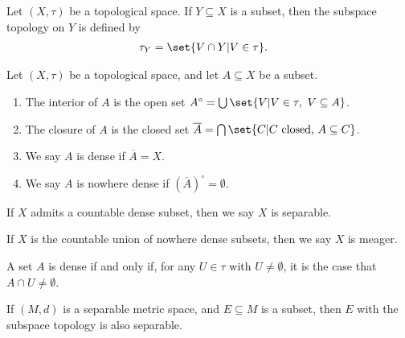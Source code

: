 \begin{definition}
Let $\left(X,\tau\right)$ be a topological space. If $Y\subseteq X$ is a subset, then the subspace topology on $Y$ is defined by
\begin{align*}
  \tau_{Y} &= \set{V\cap Y | V\in \tau}.
\end{align*}

\end{definition}
\begin{definition}\label{def:nowhere_dense}
  Let $\left(X,\tau\right)$ be a topological space, and let $A\subseteq X$ be a subset.
  \begin{enumerate}[(1)]
    \item The interior of $A$ is the open set $A^{\circ} = \bigcup\set{V | V\in\tau,~V\subseteq A}$.
    \item The closure of $A$ is the closed set $\overline{A} = \bigcap\set{C| C\text{ closed, }A\subseteq C}$.
    \item We say $A$ is dense if $\overline{A} = X$.
    \item We say $A$ is nowhere dense if $\left(\overline{A}\right)^{\circ} = \emptyset$.
  \end{enumerate}
  If $X$ admits a countable dense subset, then we say $X$ is separable.\newline

  If $X$ is the countable union of nowhere dense subsets, then we say $X$ is meager.
\end{definition}
\begin{remark}
  A set $A$ is dense if and only if, for any $U\in \tau$ with $U\neq \emptyset$, it is the case that $A\cap U \neq \emptyset$.
\end{remark}
\begin{fact}
  If $\left(M,d\right)$ is a separable metric space, and $E\subseteq M$ is a subset, then $E$ with the subspace topology is also separable.
\end{fact}
